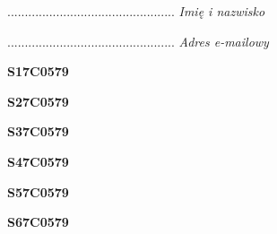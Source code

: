 \begin{turn}{90}\begin{minipage}{\linewidth} \vspace{20mm} ................................................  \textit{Imię i nazwisko}\end{minipage}\end{turn}

\begin{turn}{90}\begin{minipage}{\linewidth} \vspace{20mm} ................................................  \textit{Adres e-mailowy}\end{minipage}\end{turn}

\begin{turn}{90}\huge \begin{minipage}{\linewidth} \vspace{10mm}\textbf{S17C0579}\end{minipage}\end{turn}

\begin{turn}{90}\huge \begin{minipage}{\linewidth} \vspace{10mm}\textbf{S27C0579}\end{minipage}\end{turn}

\begin{turn}{90}\huge \begin{minipage}{\linewidth} \vspace{10mm}\textbf{S37C0579}\end{minipage}\end{turn}

\begin{turn}{90}\huge \begin{minipage}{\linewidth} \vspace{10mm}\textbf{S47C0579}\end{minipage}\end{turn}

\begin{turn}{90}\huge \begin{minipage}{\linewidth} \vspace{10mm}\textbf{S57C0579}\end{minipage}\end{turn}

\begin{turn}{90}\huge \begin{minipage}{\linewidth} \vspace{10mm}\textbf{S67C0579}\end{minipage}\end{turn}

